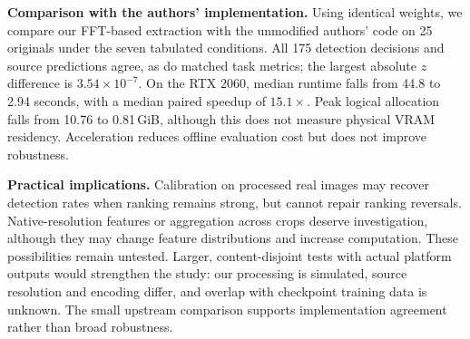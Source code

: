 \begin{samepage}
\noindent\textbf{Comparison with the authors' implementation.}
Using identical weights, we compare our FFT-based extraction with the unmodified authors' code on 25 originals under the seven tabulated conditions.
All 175 detection decisions and source predictions agree, as do matched task metrics; the largest absolute $z$ difference is $3.54\times10^{-7}$.
On the RTX 2060, median runtime falls from 44.8 to 2.94 seconds, with a median paired speedup of $15.1\times$.
Peak logical allocation falls from 10.76 to 0.81\,GiB, although this does not measure physical VRAM residency.
Acceleration reduces offline evaluation cost but does not improve robustness.
\par
\end{samepage}

\noindent\textbf{Practical implications.}
Calibration on processed real images may recover detection rates when ranking remains strong, but cannot repair ranking reversals.
Native-resolution features or aggregation across crops deserve investigation, although they may change feature distributions and increase computation.
These possibilities remain untested.
Larger, content-disjoint tests with actual platform outputs would strengthen the study: our processing is simulated, source resolution and encoding differ, and overlap with checkpoint training data is unknown.
The small upstream comparison supports implementation agreement rather than broad robustness.
